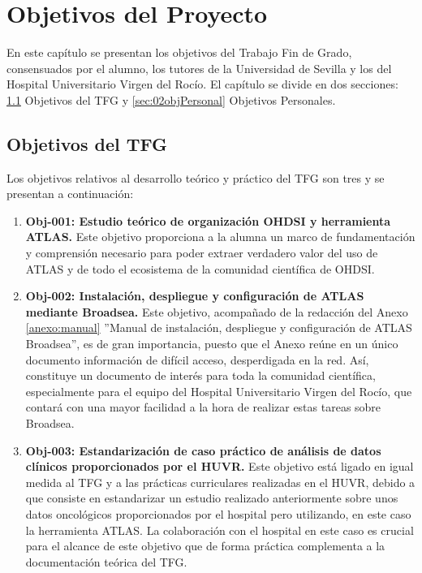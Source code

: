 \chapter{Objetivos del Proyecto}\label{cap:02objetivos}

En este capítulo se presentan los objetivos del Trabajo Fin de Grado, consensuados por el alumno, los tutores de la Universidad de Sevilla y los del Hospital Universitario Virgen del Rocío. El capítulo se divide en dos secciones: \ref{sec:02objTFG} Objetivos del TFG y  \ref{sec:02objPersonal} Objetivos Personales.

\section{Objetivos del TFG} \label{sec:02objTFG}

Los objetivos relativos al desarrollo teórico y práctico del TFG son tres y se presentan a continuación:

%

\begin{enumerate}

    \item \textbf{Obj-001: Estudio teórico de organización OHDSI y herramienta ATLAS.} Este objetivo proporciona a la alumna un marco de fundamentación y comprensión necesario para poder extraer verdadero valor del uso de ATLAS y de todo el ecosistema de la comunidad científica de OHDSI.

    \item \textbf{Obj-002: Instalación, despliegue y configuración de ATLAS mediante Broadsea.} Este objetivo, acompañado de la redacción del Anexo \ref{anexo:manual} ''Manual de instalación, despliegue y configuración de ATLAS Broadsea'', es de gran importancia, puesto que el Anexo reúne en un único documento información de difícil acceso, desperdigada en la red. Así, constituye un documento de interés para toda la comunidad científica, especialmente para el equipo del Hospital Universitario Virgen del Rocío, que contará con una mayor facilidad a la hora de realizar estas tareas sobre Broadsea.

    \item \textbf{Obj-003: Estandarización de caso práctico de análisis de datos clínicos proporcionados por el HUVR.} Este objetivo está ligado en igual medida al TFG y a las prácticas curriculares realizadas en el HUVR, debido a que consiste en estandarizar un estudio realizado anteriormente sobre unos datos oncológicos proporcionados por el hospital pero utilizando, en este caso la herramienta ATLAS. La colaboración con el hospital en este caso es crucial para el alcance de este objetivo que de forma práctica complementa a la documentación teórica del TFG.

\end{enumerate}

